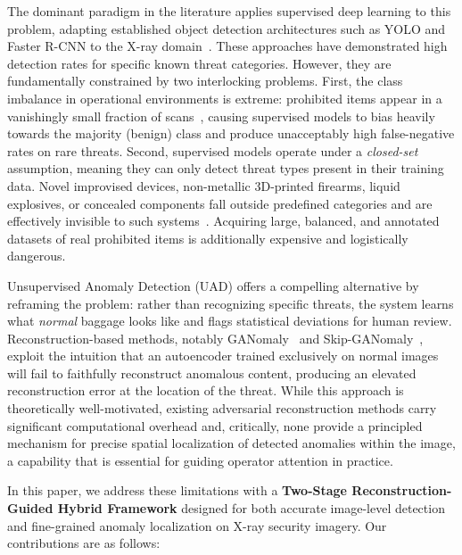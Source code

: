 \documentclass{bmvc2k}
\begin{document}
The dominant paradigm in the literature applies supervised deep learning to this 
problem, adapting established object detection architectures such as YOLO and Faster 
R-CNN to the X-ray domain~\cite{efficient2024yan}. These approaches have demonstrated high 
detection rates for specific known threat categories. However, they are fundamentally 
constrained by two interlocking problems. First, the class imbalance in operational 
environments is extreme: prohibited items appear in a vanishingly small fraction of 
scans~\cite{sixray2019lingxi}, causing supervised models to bias heavily towards the majority 
(benign) class and produce unacceptably high false-negative rates on rare threats. 
Second, supervised models operate under a \textit{closed-set} assumption, meaning they 
can only detect threat types present in their training data. Novel improvised devices, non-metallic 3D-printed firearms, liquid explosives, or concealed components fall outside predefined categories and are effectively invisible to such 
systems~\cite{baggage2022abdelfatah}. Acquiring large, balanced, and annotated datasets of real 
prohibited items is additionally expensive and logistically dangerous.

Unsupervised Anomaly Detection (UAD) offers a compelling alternative by reframing 
the problem: rather than recognizing specific threats, the system learns what 
\textit{normal} baggage looks like and flags statistical deviations for human review. 
Reconstruction-based methods, notably GANomaly~\cite{akcay2018ganomaly} and 
Skip-GANomaly~\cite{akcay2019skip}, exploit the intuition that an autoencoder trained 
exclusively on normal images will fail to faithfully reconstruct anomalous content, 
producing an elevated reconstruction error at the location of the threat. While this 
approach is theoretically well-motivated, existing adversarial reconstruction methods 
carry significant computational overhead and, critically, none provide a principled 
mechanism for precise spatial localization of detected anomalies within the image, 
a capability that is essential for guiding operator attention in practice.

In this paper, we address these limitations with a \textbf{Two-Stage 
	Reconstruction-Guided Hybrid Framework} designed for both accurate image-level 
detection and fine-grained anomaly localization on X-ray security imagery. 
Our contributions are as follows:
\end{document}
